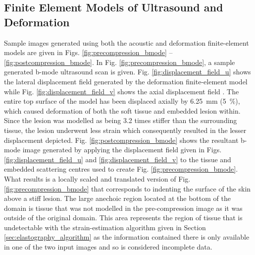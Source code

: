 		\subsection{Finite Element Models of Ultrasound and Deformation}
			\label{sec:femresults}
			Sample images generated using both the acoustic and deformation finite-element models are given in Figs. \ref{fig:precompression_bmode} -- \ref{fig:postcompression_bmode}. In Fig. \ref{fig:precompression_bmode}, a sample generated b-mode ultrasound scan is given. Fig. \ref{fig:displacement_field_u} shows the lateral displacement field generated by the deformation finite-element model while Fig. \ref{fig:displacement_field_v} shows the axial displacement field . The entire top surface of the model has been displaced axially by \SI{6.25}{\mm} (\SI{5}{\percent}), which caused deformation of both the soft tissue and embedded lesion within. Since the lesion was modelled as being 3.2 times stiffer than the surrounding tissue, the lesion underwent less strain which consequently resulted in the lesser displacement depicted. Fig. \ref{fig:postcompression_bmode} shows the resultant b-mode image generated by applying the displacement field given in Figs. \ref{fig:displacement_field_u} and \ref{fig:displacement_field_v} to the tissue and embedded scattering centres used to create Fig. \ref{fig:precompression_bmode}. What results is a locally scaled and translated version of Fig. \ref{fig:precompression_bmode} that corresponds to indenting the surface of the skin above a stiff lesion. The large anechoic region located at the bottom of the domain is tissue that was not modelled in the pre-compression image as it was outside of the original domain. This area represents the region of tissue that is undetectable with the strain-estimation algorithm given in Section \ref{sec:elastography_algorithm} as the information contained there is only available in one of the two input images and so is considered incomplete data.

